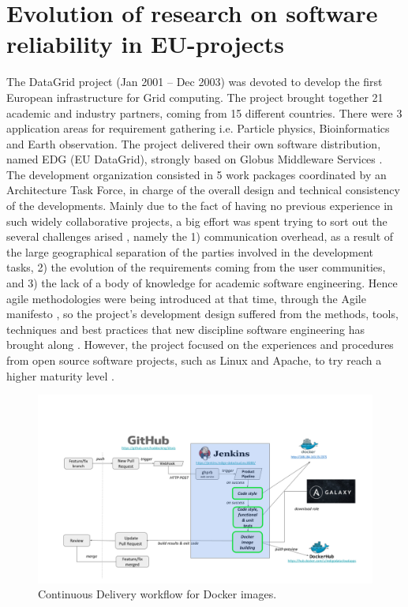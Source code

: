 \documentclass[journal]{IEEEtran}
\begin{document}
\section{Evolution of research on software reliability in EU-projects}
The DataGrid \cite{cordis:datagrid} project (Jan 2001 -- Dec 2003) was devoted
to develop the first European infrastructure for Grid computing. The project
brought together 21 academic and industry partners, coming from 15 different
countries. There were 3 application areas for requirement gathering i.e.
Particle physics, Bioinformatics and Earth observation. The project delivered
their own software distribution, named EDG (EU DataGrid), strongly based on
Globus Middleware Services \cite{globus}. The development organization
consisted in 5 work packages coordinated by an Architecture Task Force, in
charge of the overall design and technical consistency of the developments.
Mainly due to the fact of having no previous experience in such widely
collaborative projects, a big effort was spent trying to sort out the several
challenges arised \cite{datagrid}, namely the 1) communication overhead, as a
result of the large geographical separation of the parties involved in the
development tasks, 2) the evolution of the requirements coming from the user
communities, and 3) the lack of a body of knowledge for academic software
engineering. Hence agile methodologies were being introduced at that time,
through the Agile manifesto \cite{agile-manifesto}, so the project's
development design suffered from the methods, tools, techniques and best
practices that new discipline software engineering has brought along
\cite{agile}. However, the project focused on the experiences and procedures
from open source software projects, such as Linux and Apache, to try reach a
higher maturity level \cite{cmm}.

\begin{figure}
\centering
\includegraphics[width=\textwidth]{images/devops.png}
\caption{Continuous Delivery workflow for Docker images.}
\label{fig:fig_CD}
\end{figure}
\end{document}
